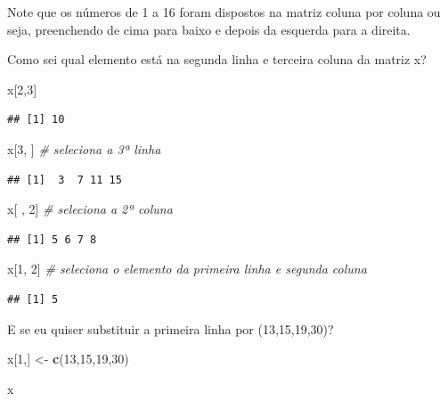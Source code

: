 \documentclass[
]{book}
\newenvironment{Shaded}{\begin{snugshade}}{\end{snugshade}}
\newcommand{\CommentTok}[1]{\textcolor[rgb]{0.56,0.35,0.01}{\textit{#1}}}
\newcommand{\DecValTok}[1]{\textcolor[rgb]{0.00,0.00,0.81}{#1}}
\newcommand{\KeywordTok}[1]{\textcolor[rgb]{0.13,0.29,0.53}{\textbf{#1}}}
\newcommand{\NormalTok}[1]{#1}
\newcommand{\StringTok}[1]{\textcolor[rgb]{0.31,0.60,0.02}{#1}}
\begin{document}
Note que os números de 1 a 16 foram dispostos na matriz coluna por coluna ou seja, preenchendo de cima para baixo e depois da esquerda para a direita.

Como sei qual elemento está na segunda linha e terceira coluna da matriz x?

\begin{Shaded}
\begin{Highlighting}[]
\NormalTok{x[}\DecValTok{2}\NormalTok{,}\DecValTok{3}\NormalTok{]}
\end{Highlighting}
\end{Shaded}

\begin{verbatim}
## [1] 10
\end{verbatim}

\begin{Shaded}
\begin{Highlighting}[]
\NormalTok{x[}\DecValTok{3}\NormalTok{,  ]   }\CommentTok{# seleciona a 3ª linha}
\end{Highlighting}
\end{Shaded}

\begin{verbatim}
## [1]  3  7 11 15
\end{verbatim}

\begin{Shaded}
\begin{Highlighting}[]
\NormalTok{x[ , }\DecValTok{2}\NormalTok{]   }\CommentTok{# seleciona a 2ª coluna}
\end{Highlighting}
\end{Shaded}

\begin{verbatim}
## [1] 5 6 7 8
\end{verbatim}

\begin{Shaded}
\begin{Highlighting}[]
\NormalTok{x[}\DecValTok{1}\NormalTok{, }\DecValTok{2}\NormalTok{]   }\CommentTok{# seleciona o elemento da primeira linha e segunda coluna}
\end{Highlighting}
\end{Shaded}

\begin{verbatim}
## [1] 5
\end{verbatim}

E se eu quiser substituir a primeira linha por (13,15,19,30)?

\begin{Shaded}
\begin{Highlighting}[]
\NormalTok{x[}\DecValTok{1}\NormalTok{,] <-}\StringTok{ }\KeywordTok{c}\NormalTok{(}\DecValTok{13}\NormalTok{,}\DecValTok{15}\NormalTok{,}\DecValTok{19}\NormalTok{,}\DecValTok{30}\NormalTok{)}

\NormalTok{x}
\end{Highlighting}
\end{Shaded}
\end{document}
